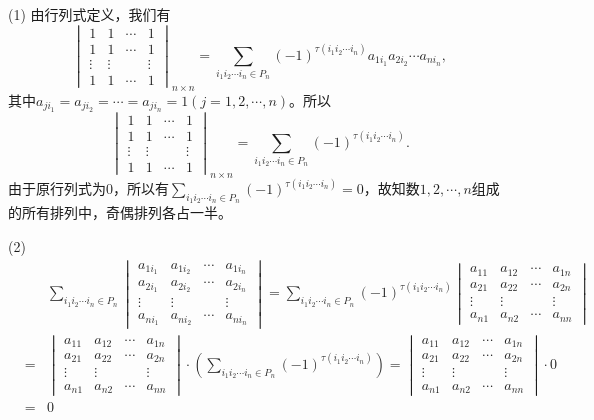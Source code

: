 \documentclass[a4paper]{book}
\newcommand{\enum}{\begin{list}{}{\setlength{\leftmargin}{0pt} \setlength{\itemindent}{2.5em} \setlength{\listparindent}{2em}}}
\begin{document}
\enum
\item[(1)] 由行列式定义，我们有
$$\begin{vmatrix} 1 & 1 & \cdots & 1 \\ 1 & 1 & \cdots & 1 \\ \vdots & \vdots &  & \vdots \\ 1 & 1 & \cdots & 1 \end{vmatrix}_{n\times n} = \sum\limits_{i_1i_2\cdots i_n\in P_n} (-1)^{\tau(i_1i_2\cdots i_n)}a_{1i_1}a_{2i_2}\cdots a_{ni_n},$$
其中$a_{ji_1} = a_{ji_2} = \cdots = a_{ji_n} = 1 (j = 1,2,\cdots,n)$。所以
$$\begin{vmatrix} 1 & 1 & \cdots & 1 \\ 1 & 1 & \cdots & 1 \\ \vdots & \vdots &  & \vdots \\ 1 & 1 & \cdots & 1 \end{vmatrix}_{n\times n} = \sum\limits_{i_1i_2\cdots i_n\in P_n} (-1)^{\tau(i_1i_2\cdots i_n)}.$$
由于原行列式为$0$，所以有$\sum\limits_{i_1i_2\cdots i_n\in P_n} (-1)^{\tau(i_1i_2\cdots i_n)} = 0$，故知数$1,2,\cdots,n$组成的所有排列中，奇偶排列各占一半。

\item[(2)]
\begin{eqnarray*}
& & \sum\limits_{i_1i_2\cdots i_n\in P_n} \begin{vmatrix} a_{1i_1} & a_{1i_2} & \cdots & a_{1i_n} \\ a_{2i_1} & a_{2i_2} & \cdots & a_{2i_n} \\ \vdots & \vdots &  & \vdots \\ a_{ni_1} & a_{ni_2} & \cdots & a_{ni_n} \end{vmatrix} = \sum\limits_{i_1i_2\cdots i_n\in P_n} (-1)^{\tau(i_1i_2\cdots i_n)}  \begin{vmatrix} a_{11} & a_{12} & \cdots & a_{1n} \\ a_{21} & a_{22} & \cdots & a_{2n} \\ \vdots & \vdots &  & \vdots \\ a_{n1} & a_{n2} & \cdots & a_{nn} \end{vmatrix} \\
& = & \begin{vmatrix} a_{11} & a_{12} & \cdots & a_{1n} \\ a_{21} & a_{22} & \cdots & a_{2n} \\ \vdots & \vdots &  & \vdots \\ a_{n1} & a_{n2} & \cdots & a_{nn} \end{vmatrix} \cdot (\sum\limits_{i_1i_2\cdots i_n\in P_n} (-1)^{\tau(i_1i_2\cdots i_n)}) = \begin{vmatrix} a_{11} & a_{12} & \cdots & a_{1n} \\ a_{21} & a_{22} & \cdots & a_{2n} \\ \vdots & \vdots &  & \vdots \\ a_{n1} & a_{n2} & \cdots & a_{nn} \end{vmatrix} \cdot 0 \\
& = & 0
\end{eqnarray*}
\end{list}
\end{document}
